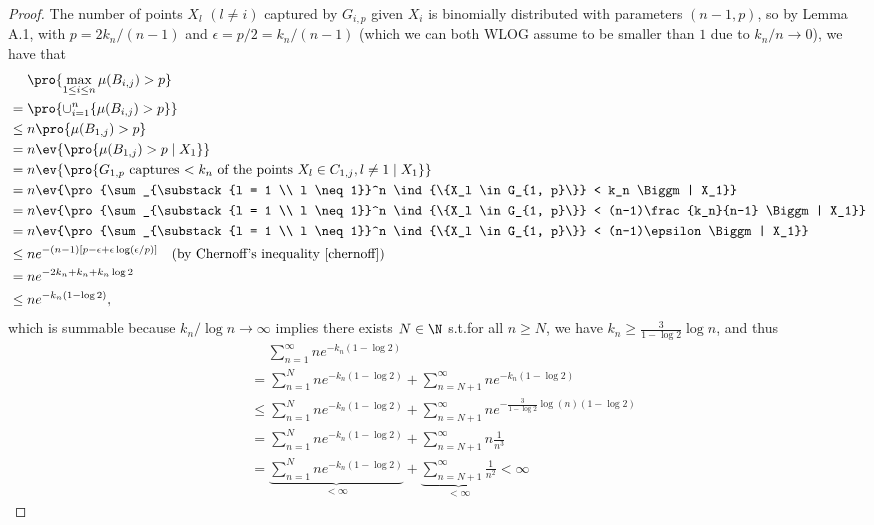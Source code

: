 \begin{proof}
    The number of points \(X_l\) \((l \neq i)\) captured by \(G_{i, p}\) given \(X_i\) is binomially distributed with parameters \((n-1, p)\), so by Lemma A.1, with \(p = 2k_n / (n-1)\) and \(\epsilon = p/2 = k_n/(n-1)\) (which we can both WLOG assume to be smaller than \(1\) due to \(k_n / n \to 0\)), we have that
    \begin{align*}
        &\quad \ \pro{\max_{1 \leq i \leq n} \mu(B_{i,j}) > p} \\
        &= \pro{\cup_{i = 1}^n \{\mu(B_{i,j}) > p\}} \\
        &\leq n \pro{\mu(B_{1, j}) > p} \\
        &= n \ev{\pro{\mu(B_{1, j}) > p \mid X_1}} \\
        &= n \ev{\pro{\text{\(G_{1, p}\) captures \(< k_n\) of the points} \ X_l \in C_{1, j}, l \neq 1 \mid X_1}} \\
        &=  n \ev{\pro{\sum_{\substack{l = 1 \\ l \neq 1}}^n \ind{\{X_l \in G_{1, p}\}} < k_n \Biggm| X_1}} \\
        &=  n \ev{\pro{\sum_{\substack{l = 1 \\ l \neq 1}}^n \ind{\{X_l \in G_{1, p}\}} < (n-1)\frac{k_n}{n-1} \Biggm| X_1}} \\
        &=  n \ev{\pro{\sum_{\substack{l = 1 \\ l \neq 1}}^n \ind{\{X_l \in G_{1, p}\}} < (n-1)\epsilon \Biggm| X_1}} \\
        &\leq ne^{-(n-1)[p-\epsilon+\epsilon \log(\epsilon/p)]} \quad(\text{by Chernoff's inequality \ref{chernoff}}) \\
        &= ne^{-2k_n + k_n + k_n \log 2} \\
        &\leq ne^{-k_n( 1 - \log 2)},
    \end{align*}
    which is summable because \(k_n / \log n \to \infty\) implies there exists \(N \in \N\) s.t.\@ for all \(n \geq N\), we have \(k_n \geq \frac{3}{1-\log 2} \log n\), and thus
    \begin{align*}
        &\quad \ \sum_{n=1}^\infty ne^{-k_n( 1 - \log 2)} \\
        &= \sum_{n=1}^N ne^{-k_n( 1 - \log 2)} + \sum_{n=N+1}^\infty ne^{-k_n( 1 - \log 2)} \\
        &\leq \sum_{n=1}^N ne^{-k_n( 1 - \log 2)} + \sum_{n=N+1}^\infty ne^{-\frac{3}{1-\log 2} \log(n) ( 1 - \log 2)} \\
        &= \sum_{n=1}^N ne^{-k_n( 1 - \log 2)} + \sum_{n=N+1}^\infty n \frac{1}{n^3} \\
        &= \underset{< \infty}{\underbrace{\sum_{n=1}^N ne^{-k_n( 1 - \log 2)}}} + \underset{< \infty}{\underbrace{\sum_{n=N+1}^\infty \frac{1}{n^2}}} < \infty
    \end{align*}
    
\end{proof}

